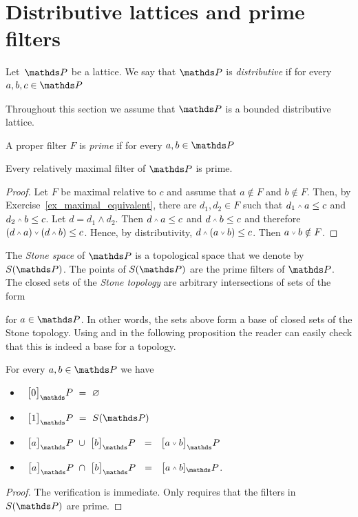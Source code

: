 \section{Distributive lattices and prime filters}\label{prime_filters}

Let\ $\PP$ be a lattice.
We say that $\PP$ is \emph{distributive\/} if for every $a,b,c\in\PP$



Throughout this section we assume that $\PP$ is a bounded distributive lattice.

A proper filter $F$ is \emph{prime\/} if for every $a,b\in\PP$


\begin{proposition}\label{prop_massimalisonoprimi}
Every relatively maximal filter of\/ $\PP$ is prime.
\end{proposition}

\begin{proof}
Let $F$ be maximal relative to $c$ and assume that $a\notin F$ and $b\notin F$.
Then, by Exercise~\ref{ex_maximal_equivalent}, there are $d_1, d_2\in F$ such that $d_1\swedge a\le c$ and $d_2\swedge b\le c$.
Let $d=d_1\wedge d_2$.
Then  $d\swedge a\le c$ and $d\swedge b\le c$ and therefore $(d\swedge a)\svee(d\swedge b)\le c$.
Hence, by distributivity, $d\swedge (a\svee b)\le c$.
Then $a\svee b\notin F$.
\end{proof}

The \emph{Stone space\/} of $\PP$ is a topological space that we denote by \emph{$S(\PP)$}.
The points of \emph{$S(\PP)$} are the prime filters of $\PP$.
The closed sets of the \emph{Stone topology} are arbitrary intersections of sets of the form


for $a\in\PP$.
In other words, the sets above form a base of closed sets of the Stone topology.
Using  and  in the following proposition the reader can easily check that this is indeed a base for a topology.

\begin{proposition}\label{prop_brouwerstopology}
For every $a,b\in\PP$ we have
\begin{itemize}
\item[1.]\ $\big[0\big]_\PP\ =\ \varnothing$
\item[2.]\ $\big[1\big]_\PP\ =\ S(\PP)$
\item[3.]\ $\big[a\big]_\PP\ \cup\ \big[b\big]_\PP\ \ =\ \ \big[a\svee b\big]_\PP$
\item[4.]\ $\big[a\big]_\PP\ \cap\ \big[b\big]_\PP\ \ =\ \ \big[a\swedge b]_\PP$.
\end{itemize}
\end{proposition}
\begin{proof}
The verification is immediate.
Only  requires that the filters in $S(\PP)$ are prime.
\end{proof}

